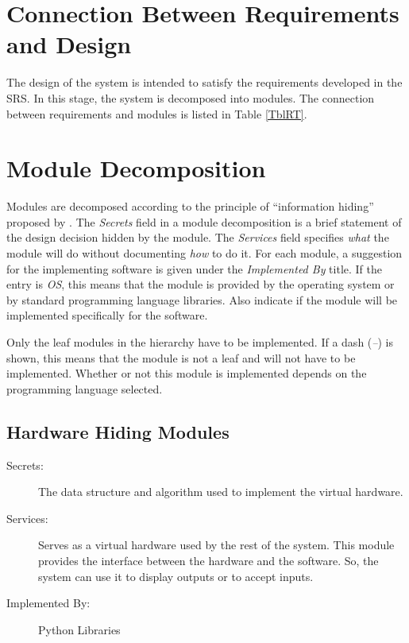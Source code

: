\documentclass[12pt, titlepage]{article}
\begin{document}
\section{Connection Between Requirements and Design} \label{SecConnection}

The design of the system is intended to satisfy the requirements developed in
the SRS. In this stage, the system is decomposed into modules. The connection
between requirements and modules is listed in Table \ref{TblRT}.

\section{Module Decomposition} \label{SecMD}

Modules are decomposed according to the principle of ``information hiding''
proposed by \citet{ParnasEtAl1984}. The \emph{Secrets} field in a module
decomposition is a brief statement of the design decision hidden by the
module. The \emph{Services} field specifies \emph{what} the module will do
without documenting \emph{how} to do it. For each module, a suggestion for the
implementing software is given under the \emph{Implemented By} title. If the
entry is \emph{OS}, this means that the module is provided by the operating
system or by standard programming language libraries.  Also indicate if the
module will be implemented specifically for the software.

Only the leaf modules in the
hierarchy have to be implemented. If a dash (\emph{--}) is shown, this means
that the module is not a leaf and will not have to be implemented. Whether or
not this module is implemented depends on the programming language
selected.

\subsection{Hardware Hiding Modules}

\begin{description}
\item[Secrets:]The data structure and algorithm used to implement the virtual
  hardware.
\item[Services:]Serves as a virtual hardware used by the rest of the
  system. This module provides the interface between the hardware and the
  software. So, the system can use it to display outputs or to accept inputs.
\item[Implemented By:] Python Libraries
\end{description}
\end{document}
